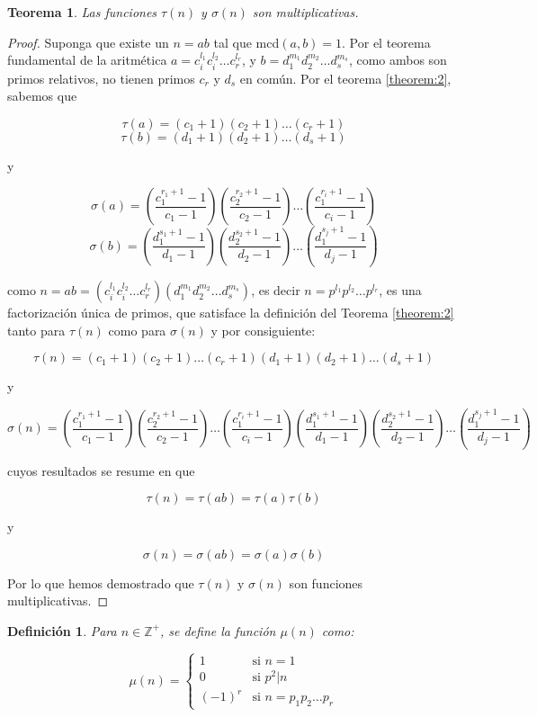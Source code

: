 \documentclass{article}
\newtheorem{theorem}{Teorema}[]
\newtheorem{definition}{Definición}[]
\begin{document}
\begin{theorem}
	Las funciones $\tau(n)$ y $\sigma(n)$ son multiplicativas.
\end{theorem}
\begin{proof} Suponga que existe un $n = ab$ tal que mcd$(a,b) = 1$. Por el teorema fundamental de la aritmética $a = c^{l_1}_i c^{l_2}_i \dots c^{l_r}_r$, y $b = d^{m_1}_1 d^{m_2}_2 \dots d^{m_s}_s$, como ambos son primos relativos, no tienen primos $c_r$ y $d_s$ en común. Por el teorema \ref{theorem:2}, sabemos que
	
	$$\tau(a) = (c_1 + 1) (c_2 + 1) \dots (c_r + 1)$$
	$$\tau(b) = (d_1 + 1) (d_2 + 1) \dots (d_s + 1)$$

y

$$\sigma(a) = \left( \frac{c^{r_1 + 1}_1 - 1}{c_1 - 1} \right) \left( \frac{c^{r_2 + 1}_2 - 1}{c_2 - 1} \right) \dots \left( \frac{c^{r_i + 1}_1 - 1}{c_i - 1} \right)$$
$$\sigma(b) = \left( \frac{d^{s_1 + 1}_1 - 1}{d_1 - 1} \right) \left( \frac{d^{s_2 + 1}_2 - 1}{d_2 - 1} \right) \dots \left( \frac{d^{s_j + 1}_1 - 1}{d_j - 1} \right)$$

como $n = ab =  (c^{l_1}_i c^{l_2}_i \dots c^{l_r}_r) (d^{m_1}_1 d^{m_2}_2 \dots d^{m_s}_s)$, es decir $n = p^{l_1} p^{l_2} \dots p^{l_r}$, es una factorización única de primos, que satisface la definición del Teorema \ref{theorem:2} tanto para $\tau(n)$ como para $\sigma(n)$ y por consiguiente:

$$\tau(n) = (c_1 + 1) (c_2 + 1) \dots (c_r + 1) (d_1 + 1) (d_2 + 1) \dots (d_s + 1)$$

y

$$\sigma(n) = \left( \frac{c^{r_1 + 1}_1 - 1}{c_1 - 1} \right) \left( \frac{c^{r_2 + 1}_2 - 1}{c_2 - 1} \right) \dots \left( \frac{c^{r_i + 1}_1 - 1}{c_i - 1} \right) \left( \frac{d^{s_1 + 1}_1 - 1}{d_1 - 1} \right) \left( \frac{d^{s_2 + 1}_2 - 1}{d_2 - 1} \right) \dots \left( \frac{d^{s_j + 1}_1 - 1}{d_j - 1} \right)$$

cuyos resultados se resume en que
 
$$\tau(n) = \tau(ab) = \tau(a) \tau(b)$$

y

$$\sigma(n) = \sigma(ab) = \sigma(a) \sigma(b)$$

Por lo que hemos demostrado que $\tau(n)$ y $\sigma(n)$ son funciones multiplicativas.
\end{proof}

\begin{definition}
	Para $n \in \mathbb{Z}^+$, se define la función $\mu(n)$ como:
	
	\[
		\mu(n) =
		\begin{cases}
			1 & \text{si } n = 1\\
			0 & \text{si } p^2|n\\
			(-1)^r & \text{si } n = p_1 p_2 \dots p_r
		\end{cases} 
	\] 
\end{definition}
\end{document}
